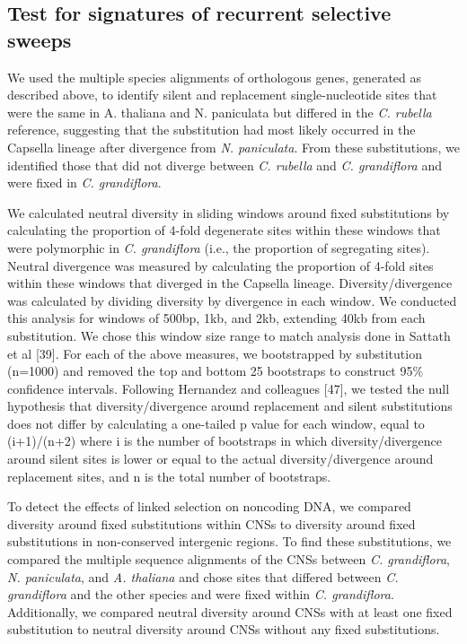 \subsection{Test for signatures of recurrent selective sweeps}
We used the multiple species alignments of orthologous genes, generated as described above, to identify silent and replacement single-nucleotide sites that were the same in A. thaliana and N. paniculata but differed in the \textit{C. rubella} reference, suggesting that the substitution had most likely occurred in the Capsella lineage after divergence from \textit{N. paniculata}. From these substitutions, we identified those that did not diverge between \textit{C. rubella} and \textit{C. grandiflora} and were fixed in \textit{C. grandiflora}.

We calculated neutral diversity in sliding windows around fixed substitutions by calculating the proportion of 4-fold degenerate sites within these windows that were polymorphic in \textit{C. grandiflora} (i.e., the proportion of segregating sites). Neutral divergence was measured by calculating the proportion of 4-fold sites within these windows that diverged in the Capsella lineage. Diversity/divergence was calculated by dividing diversity by divergence in each window. We conducted this analysis for windows of 500bp, 1kb, and 2kb, extending 40kb from each substitution. We chose this window size range to match analysis done in Sattath et al [39]. For each of the above measures, we bootstrapped by substitution (n=1000) and removed the top and bottom 25 bootstraps to construct 95\% confidence intervals. Following Hernandez and colleagues [47], we tested the null hypothesis that diversity/divergence around replacement and silent substitutions does not differ by calculating a one-tailed p value for each window, equal to (i+1)/(n+2) where i is the number of bootstraps in which diversity/divergence around silent sites is lower or equal to the actual diversity/divergence around replacement sites, and n is the total number of bootstraps.

To detect the effects of linked selection on noncoding DNA, we compared diversity around fixed substitutions within CNSs to diversity around fixed substitutions in non-conserved intergenic regions. To find these substitutions, we compared the multiple sequence alignments of the CNSs between \textit{C. grandiflora}, \textit{N. paniculata}, and \textit{A. thaliana} and chose sites that differed between \textit{C. grandiflora} and the other species and were fixed within \textit{C. grandiflora}. Additionally, we compared neutral diversity around CNSs with at least one fixed substitution to neutral diversity around CNSs without any fixed substitutions. 

